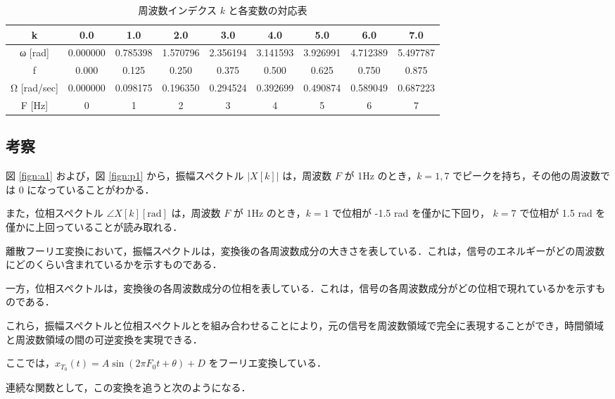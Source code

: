 \documentclass[fleqn, a4paper. 12pt]{jsarticle}
\begin{document}
    \begin{table}[!h]
      \centering
      \caption{周波数インデクス $k$ と各変数の対応表}
      \begin{tabular}{c|c|c|c|c|c|c|c|c}
        k & 0.0 & 1.0 & 2.0 & 3.0 & 4.0 & 5.0 & 6.0 & 7.0 \\
        \hline
        ω [rad] & 0.000000 & 0.785398 & 1.570796 & 2.356194 & 3.141593 & 3.926991 & 4.712389 & 5.497787 \\
        f & 0.000 & 0.125 & 0.250 & 0.375 & 0.500 & 0.625 & 0.750 & 0.875 \\
        Ω [rad/sec] & 0.000000 & 0.098175 & 0.196350 & 0.294524 & 0.392699 & 0.490874 & 0.589049 & 0.687223 \\
        F [Hz] & 0 & 1 & 2 & 3 & 4 & 5 & 6 & 7 
      \end{tabular}
      \label{tab:1}
    \end{table}

    \subsection*{考察}

      図 \ref{fign:a1} および，図 \ref{fign:p1} から，振幅スペクトル $|X[k]|$ は，周波数 $F$ が 1Hz のとき，$k=1, 7$ でピークを持ち，その他の周波数では 0 になっていることがわかる．

      また，位相スペクトル $\angle X[k][\mathrm{rad}]$ は，周波数 $F$ が 1Hz のとき，$k=1$ で位相が -1.5 rad を僅かに下回り， $k=7$ で位相が 1.5 rad を僅かに上回っていることが読み取れる．

      \quad

      離散フーリエ変換において，振幅スペクトルは，変換後の各周波数成分の大きさを表している．これは，信号のエネルギーがどの周波数にどのくらい含まれているかを示すものである．
      
      一方，位相スペクトルは，変換後の各周波数成分の位相を表している．これは，信号の各周波数成分がどの位相で現れているかを示すものである．

      これら，振幅スペクトルと位相スペクトルとを組み合わせることにより，元の信号を周波数領域で完全に表現することができ，時間領域と周波数領域の間の可逆変換を実現できる．

      \quad

      ここでは，$x_{T_0}(t)=A \sin \left(2 \pi F_0 t+\theta\right)+D$ をフーリエ変換している．
      
      連続な関数として，この変換を追うと次のようになる．
\end{document}

